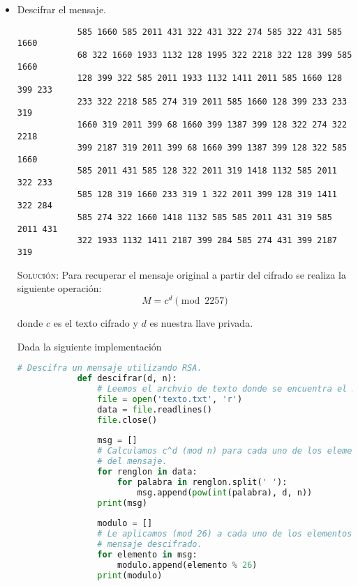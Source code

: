 \documentclass[letterpaper,11pt]{article}
\begin{document}
\begin{enumerate}
\begin{enumerate}
\begin{itemize}
            \item Descifrar el mensaje. 
            \begin{verbatim}
            585 1660 585 2011 431 322 431 322 274 585 322 431 585 1660 
            68 322 1660 1933 1132 128 1995 322 2218 322 128 399 585 1660 
            128 399 322 585 2011 1933 1132 1411 2011 585 1660 128 399 233 
            233 322 2218 585 274 319 2011 585 1660 128 399 233 233 319 
            1660 319 2011 399 68 1660 399 1387 399 128 322 274 322 2218 
            399 2187 319 2011 399 68 1660 399 1387 399 128 322 585 1660 
            585 2011 431 585 128 322 2011 319 1418 1132 585 2011 322 233 
            585 128 319 1660 233 319 1 322 2011 399 128 319 1411 322 284 
            585 274 322 1660 1418 1132 585 585 2011 431 319 585 2011 431 
            322 1933 1132 1411 2187 399 284 585 274 431 399 2187 319
            \end{verbatim}
        
            \textsc{Solución:} Para recuperar el mensaje original a partir del 
            cifrado se realiza la siguiente operación:
            \begin{equation*}
                M = c^{d} \pmod{2257}
            \end{equation*}
            
            donde $c$ es el texto cifrado y $d$ es nuestra llave privada. 
            
            Dada la siguiente implementación
            \begin{lstlisting}[language=Python]
            # Descifra un mensaje utilizando RSA. 
            def descifrar(d, n):
                # Leemos el archvio de texto donde se encuentra el mensaje.
                file = open('texto.txt', 'r')
                data = file.readlines()
                file.close()
            
                msg = []
                # Calculamos c^d (mod n) para cada uno de los elementos 
                # del mensaje.
                for renglon in data:
                    for palabra in renglon.split(' '):
                        msg.append(pow(int(palabra), d, n))
                print(msg)
            
                modulo = []
                # Le aplicamos (mod 26) a cada uno de los elementos del 
                # mensaje descifrado.
                for elemento in msg:
                    modulo.append(elemento % 26)
                print(modulo)
                    

\end{lstlisting}
\end{itemize}
\end{enumerate}
\end{enumerate}
\end{document}
